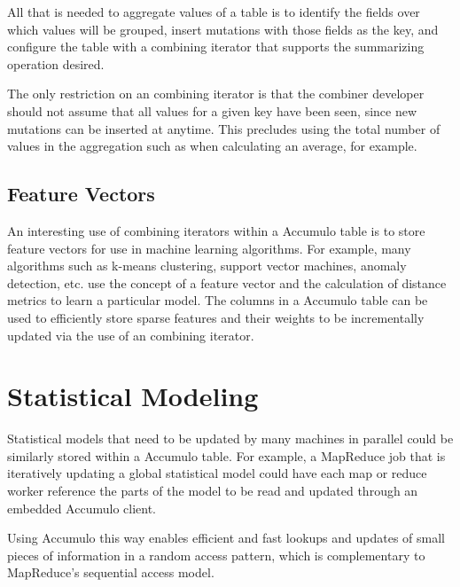 All that is needed to aggregate values of a table is to identify the fields over which
values will be grouped, insert mutations with those fields as the key, and configure
the table with a combining iterator that supports the summarizing operation
desired.

The only restriction on an combining iterator is that the combiner developer
should not assume that all values for a given key have been seen, since new
mutations can be inserted at anytime. This precludes using the total number of
values in the aggregation such as when calculating an average, for example.

\subsection{Feature Vectors}

An interesting use of combining iterators within a Accumulo table is to store
feature vectors for use in machine learning algorithms. For example, many
algorithms such as k-means clustering, support vector machines, anomaly detection,
etc. use the concept of a feature vector and the calculation of distance metrics to
learn a particular model. The columns in a Accumulo table can be used to efficiently
store sparse features and their weights to be incrementally updated via the use of an
combining iterator.

\section{Statistical Modeling}

Statistical models that need to be updated by many machines in parallel could be
similarly stored within a Accumulo table. For example, a MapReduce job that is
iteratively updating a global statistical model could have each map or reduce worker
reference the parts of the model to be read and updated through an embedded
Accumulo client.

Using Accumulo this way enables efficient and fast lookups and updates of small
pieces of information in a random access pattern, which is complementary to
MapReduce's sequential access model.

